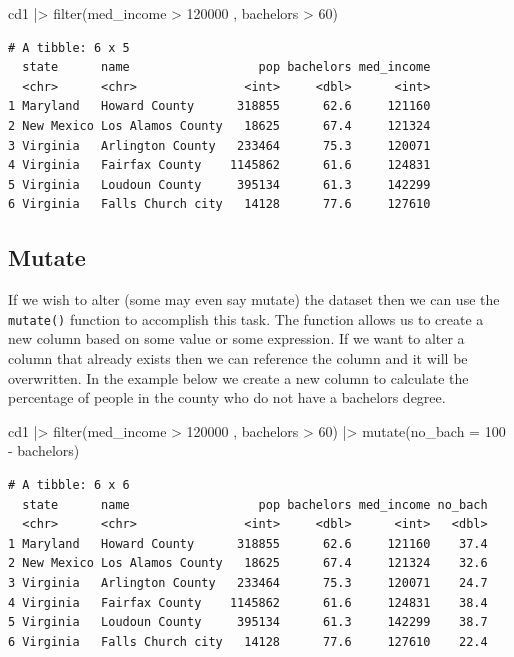 \documentclass[
  letterpaper,
  DIV=11,
  numbers=noendperiod]{scrreprt}
\newenvironment{Shaded}{\begin{snugshade}}{\end{snugshade}}
\newcommand{\AttributeTok}[1]{\textcolor[rgb]{0.40,0.45,0.13}{#1}}
\newcommand{\DecValTok}[1]{\textcolor[rgb]{0.68,0.00,0.00}{#1}}
\newcommand{\FunctionTok}[1]{\textcolor[rgb]{0.28,0.35,0.67}{#1}}
\newcommand{\NormalTok}[1]{\textcolor[rgb]{0.00,0.23,0.31}{#1}}
\newcommand{\SpecialCharTok}[1]{\textcolor[rgb]{0.37,0.37,0.37}{#1}}
\begin{document}
\begin{Shaded}
\begin{Highlighting}[]
\NormalTok{cd1 }\SpecialCharTok{|\textgreater{}} \FunctionTok{filter}\NormalTok{(med\_income }\SpecialCharTok{\textgreater{}} \DecValTok{120000}\NormalTok{ , bachelors }\SpecialCharTok{\textgreater{}} \DecValTok{60}\NormalTok{)}
\end{Highlighting}
\end{Shaded}

\begin{verbatim}
# A tibble: 6 x 5
  state      name                  pop bachelors med_income
  <chr>      <chr>               <int>     <dbl>      <int>
1 Maryland   Howard County      318855      62.6     121160
2 New Mexico Los Alamos County   18625      67.4     121324
3 Virginia   Arlington County   233464      75.3     120071
4 Virginia   Fairfax County    1145862      61.6     124831
5 Virginia   Loudoun County     395134      61.3     142299
6 Virginia   Falls Church city   14128      77.6     127610
\end{verbatim}

\subsection{Mutate}\label{mutate}

If we wish to alter (some may even say mutate) the dataset then we can
use the \texttt{mutate()} function to accomplish this task. The function
allows us to create a new column based on some value or some expression.
If we want to alter a column that already exists then we can reference
the column and it will be overwritten. In the example below we create a
new column to calculate the percentage of people in the county who do
not have a bachelors degree.

\begin{Shaded}
\begin{Highlighting}[]
\NormalTok{cd1 }\SpecialCharTok{|\textgreater{}} \FunctionTok{filter}\NormalTok{(med\_income }\SpecialCharTok{\textgreater{}} \DecValTok{120000}\NormalTok{ , bachelors }\SpecialCharTok{\textgreater{}} \DecValTok{60}\NormalTok{) }\SpecialCharTok{|\textgreater{}}
    \FunctionTok{mutate}\NormalTok{(}\AttributeTok{no\_bach =} \DecValTok{100} \SpecialCharTok{{-}}\NormalTok{ bachelors)}
\end{Highlighting}
\end{Shaded}

\begin{verbatim}
# A tibble: 6 x 6
  state      name                  pop bachelors med_income no_bach
  <chr>      <chr>               <int>     <dbl>      <int>   <dbl>
1 Maryland   Howard County      318855      62.6     121160    37.4
2 New Mexico Los Alamos County   18625      67.4     121324    32.6
3 Virginia   Arlington County   233464      75.3     120071    24.7
4 Virginia   Fairfax County    1145862      61.6     124831    38.4
5 Virginia   Loudoun County     395134      61.3     142299    38.7
6 Virginia   Falls Church city   14128      77.6     127610    22.4
\end{verbatim}
\end{document}
